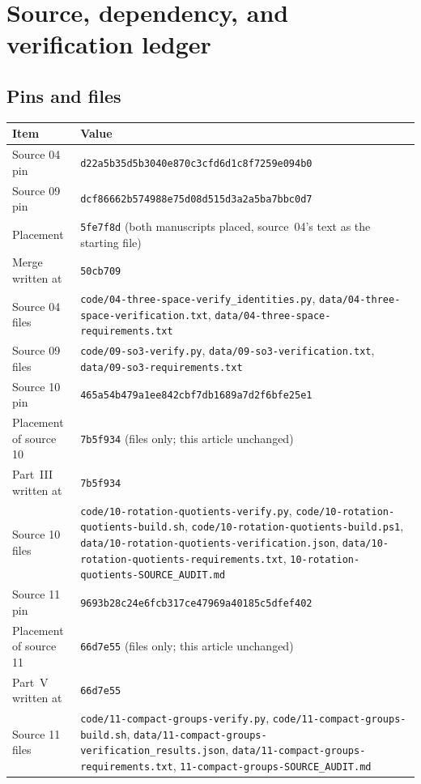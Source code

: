 \documentclass[11pt,letterpaper]{article}
\numberwithin{equation}{section}
\theoremstyle{definition}
\theoremstyle{remark}
\begin{document}
\section{Source, dependency, and verification ledger}\label{e3:app:ledger}

\subsection{Pins and files}

\begin{center}\small
\begin{tabular}{L{0.2\textwidth}L{0.72\textwidth}}
\toprule
Item & Value\\
\midrule
Source 04 pin & \texttt{d22a5b35d5b3040e870c3cfd6d1c8f7259e094b0}\\
Source 09 pin & \texttt{dcf86662b574988e75d08d515d3a2a5ba7bbc0d7}\\
Placement & \texttt{5fe7f8d} (both manuscripts placed, source~04's text as the
 starting file)\\
Merge written at & \texttt{50cb709}\\
Source 04 files & \texttt{code/04-three-space-verify\_identities.py},
 \texttt{data/04-three-space-verification.txt},
 \texttt{data/04-three-space-requirements.txt}\\
Source 09 files & \texttt{code/09-so3-verify.py},
 \texttt{data/09-so3-verification.txt},
 \texttt{data/09-so3-requirements.txt}\\
Source 10 pin & \texttt{465a54b479a1ee842cbf7db1689a7d2f6bfe25e1}\\
Placement of source 10 & \texttt{7b5f934} (files only; this article unchanged)\\
Part~III written at & \texttt{7b5f934}\\
Source 10 files & \texttt{code/10-rotation-quotients-verify.py},
 \texttt{code/10-rotation-quotients-build.sh},
 \texttt{code/10-rotation-quotients-build.ps1},
 \texttt{data/10-rotation-quotients-verification.json},
 \texttt{data/10-rotation-quotients-requirements.txt},
 \texttt{10-rotation-quotients-SOURCE\_AUDIT.md}\\
Source 11 pin & \texttt{9693b28c24e6fcb317ce47969a40185c5dfef402}\\
Placement of source 11 & \texttt{66d7e55} (files only; this article unchanged)\\
Part~V written at & \texttt{66d7e55}\\
Source 11 files & \texttt{code/11-compact-groups-verify.py},
 \texttt{code/11-compact-groups-build.sh},
 \texttt{data/11-compact-groups-verification\_results.json},
 \texttt{data/11-compact-groups-requirements.txt},
 \texttt{11-compact-groups-SOURCE\_AUDIT.md}\\
\bottomrule
\end{tabular}
\end{center}
\end{document}
